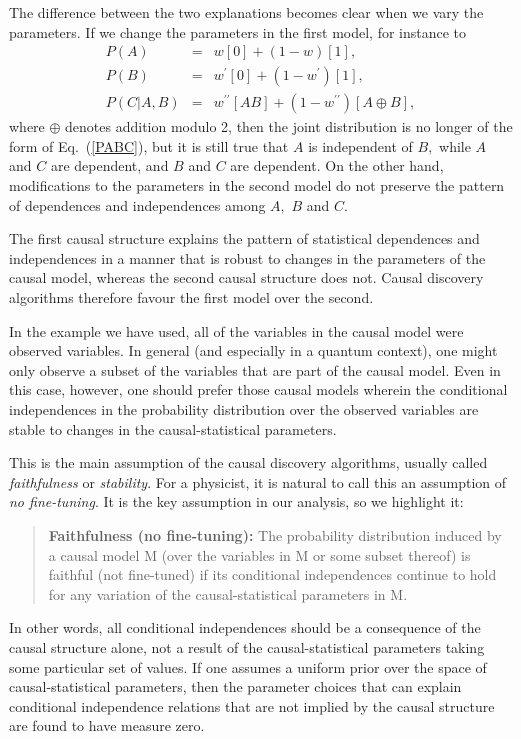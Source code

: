 \documentclass[letterpaper,onecolumn,nofootinbib]{revtex4}
\begin{document}
The difference between the two explanations becomes clear when we vary the
parameters.  If we change the parameters in the first model, for instance
to
\begin{eqnarray*}
P(A) &=&w[0]+(1-w)[1], \\
P(B) &=&w^{\prime }[0]+\left( 1-w^{\prime }\right) [1], \\
P(C|A,B) &=&w^{\prime \prime }\left[ AB\right] +(1-w^{\prime \prime })[A\oplus B],
\end{eqnarray*}
where $\oplus$ denotes addition modulo 2, then the joint distribution is no longer of the form of Eq.~(\ref{PABC}),
but it is still true that $A$ is independent of $B,$ while $A$ and $C$ are
dependent, and $B$ and $C$ are dependent. On the other hand, modifications
to the parameters in the second model do not preserve the pattern of
dependences and independences among $A,$ $B$ and $C.$

The first causal structure explains the pattern of statistical dependences
and independences in a manner that is robust to changes in the parameters of
the causal model, whereas the second causal structure does not. Causal
discovery algorithms therefore favour the first model over the second.

In the example we have used, all of the variables in the causal model were observed variables.  In general (and especially in a quantum context), one might only observe a subset of the variables that are part of the causal model. Even in this case, however, one should prefer those causal models wherein the conditional independences in the probability distribution over the observed variables are stable to changes in the causal-statistical parameters.

This is the main assumption of the causal discovery algorithms, usually
called \emph{faithfulness }\cite{Spirtes2001} or \emph{stability}\cite{Pearl2009}.   For a physicist, it is natural to call this an assumption of \emph{no fine-tuning}. \color{black}  It is the key
assumption in our analysis, so we highlight it:

\begin{quote}
\textbf{Faithfulness (no fine-tuning): }The probability distribution induced by a causal
model M (over the variables in M or some subset thereof) is faithful (not fine-tuned) if its conditional independences continue to hold for any variation of the causal-statistical parameters in M.
\end{quote}

In other words, all conditional independences should be a consequence of the causal structure alone, not a result of the causal-statistical parameters taking some particular set of values.
If one assumes a uniform prior over the space of causal-statistical parameters, then the parameter choices that can explain 
conditional independence relations that are not implied by the causal structure are found to have measure zero.
\end{document}
